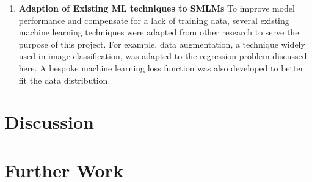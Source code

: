 \begin{enumerate}
	\item \textbf{Adaption of Existing ML techniques to SMLMs}
	To improve model performance and compensate for a lack of training data, several existing machine learning techniques were adapted from other research to serve the purpose of this project. For example, data augmentation, a technique widely used in image classification, was adapted to the regression problem discussed here. A bespoke machine learning loss function was also developed to better fit the data distribution. 
	
	
\end{enumerate}

\section{Discussion}

\section{Further Work}



